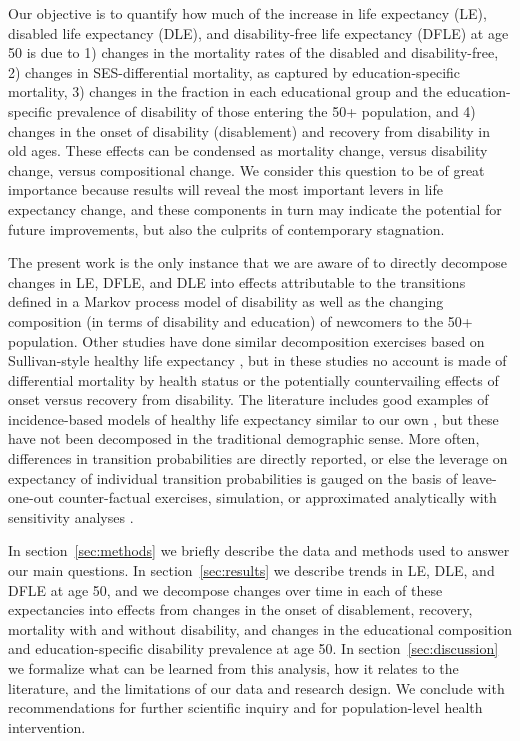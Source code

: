 Our objective is to quantify how much of the increase in life expectancy (LE), disabled life expectancy (DLE), and disability-free life expectancy (DFLE) at age 50 is due to 1) changes in the mortality rates of the disabled and disability-free, 2) changes in SES-differential mortality, as captured by education-specific mortality, 3) changes in the fraction in each educational group and the education-specific prevalence of disability of those entering the 50+ population, and 4) changes in the onset of disability (disablement) and recovery from disability in old ages. These effects can be condensed as mortality change, versus disability change, versus compositional change. We consider this question to be of great importance because results will reveal the most important levers in life expectancy change, and these components in turn may indicate the potential for future improvements, but also the culprits of contemporary stagnation. 

The present work is the only instance that we are aware of to directly decompose changes in LE, DFLE, and DLE into effects attributable to the transitions defined in a Markov process model of disability as well as the changing composition (in terms of disability and education) of newcomers to the 50+ population. Other studies have done similar decomposition exercises based on Sullivan-style healthy life expectancy \citep[e.g.,][]{andreev2003health, nusselder2005contribution, van2011contribution, heijink2011decomposing, van2013gender, freedman2016disability, chernew2016understanding}, but in these studies no account is made of differential mortality by health status or the potentially countervailing effects of onset versus recovery from disability. The literature includes good examples of incidence-based models of healthy life expectancy similar to our own \citep[e.g.,][]{crimmins2009change, reuser2011higher, montez2014cumulative}, but these have not been decomposed in the traditional demographic sense. More often, differences in transition probabilities are directly reported, or else the leverage on expectancy of individual transition probabilities is gauged on the basis of leave-one-out counter-factual exercises, simulation, or approximated analytically with sensitivity analyses \citep{reuser2010effect}.

In section~\ref{sec:methods} we briefly describe the data and methods used to answer our main questions. In section~\ref{sec:results} we describe trends in LE, DLE, and DFLE at age 50, and we decompose changes over time in each of these expectancies into effects from changes in the onset of disablement, recovery, mortality with and without disability, and changes in the educational composition and education-specific disability prevalence at age 50. In section~\ref{sec:discussion} we formalize what can be learned from this analysis, how it relates to the literature, and the limitations of our data and research design. We conclude with recommendations for further scientific inquiry and for population-level health intervention.

